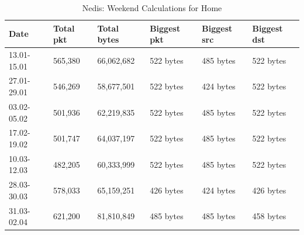 \begin{table}[H]
    \caption{Nedis: Weekend Calculations for Home}
    \begin{tabular}{|l|l|l|l|l|l|}
        \hline
        \textbf{Date}    & \textbf{Total pkt} & \textbf{Total bytes} & \textbf{Biggest pkt} & \textbf{Biggest src} & \textbf{Biggest dst} \\ \hline
        13.01-15.01      & 565,380            & 66,062,682           & 522 bytes            & 485 bytes            & 522 bytes            \\ \hline
        27.01-29.01      & 546,269            & 58,677,501           & 522 bytes            & 424 bytes            & 522 bytes            \\ \hline
        03.02-05.02      & 501,936            & 62,219,835           & 522 bytes            & 485 bytes            &    522 bytes            \\ \hline
        17.02-19.02      & 501,747            & 64,037,197           & 522 bytes            & 485 bytes            & 522 bytes            \\ \hline
        10.03-12.03      & 482,205            & 60,333,999           & 522 bytes            & 485 bytes            & 522 bytes            \\ \hline
        28.03-30.03      & 578,033            & 65,159,251           & 426 bytes            & 424 bytes            & 426 bytes            \\ \hline
        31.03-02.04      & 621,200            & 81,810,849           & 485 bytes            & 485 bytes            & 458 bytes            \\ \hline
    \end{tabular}
    \label{tab:NedisHomeWeekends}
\end{table}

